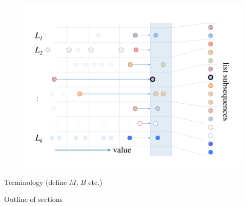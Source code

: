 \begin{figure}[h]
\includegraphics[scale=.33333]{cache-oblivious-fractional-cascading-c.pdf}
\caption{}
\label{fig:coalesced_bin} 
\end{figure}

Terminology (define $M$, $B$ etc.)

Outline of sections
